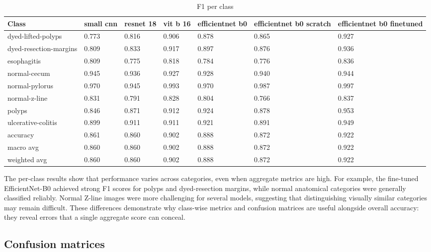 \documentclass[conference]{IEEEtran}
\begin{document}
\begin{table}[ht]
\caption{F1 per class}
\begin{center}
\begin{tabular}{|m{4em}|m{2em}|m{2em}|m{1.8em}|m{4em}|m{4em}|m{4em}|}
\hline
\textbf{Class}&small cnn & resnet 18 & vit b 16 & efficientnet b0 & efficientnet b0 scratch & efficientnet b0 finetuned\\
\hline
dyed-lifted-polyps & 0.773 & 0.816 & 0.906 & 0.878 & 0.865 & 0.927 \\
dyed-resection-margins & 0.809 & 0.833 & 0.917 & 0.897 & 0.876 & 0.936 \\
esophagitis & 0.809 & 0.775 & 0.818 & 0.784 & 0.776 & 0.836 \\
normal-cecum & 0.945 & 0.936 & 0.927 & 0.928 & 0.940 & 0.944 \\
normal-pylorus & 0.970 & 0.945 & 0.993 & 0.970 & 0.987 & 0.997 \\
normal-z-line & 0.831 & 0.791 & 0.828 & 0.804 & 0.766 & 0.837 \\
polyps & 0.846 & 0.871 & 0.912 & 0.924 & 0.878 & 0.953 \\
ulcerative-colitis & 0.899 & 0.911 & 0.911 & 0.921 & 0.891 & 0.949 \\
accuracy & 0.861 & 0.860 & 0.902 & 0.888 & 0.872 & 0.922 \\
macro avg & 0.860 & 0.860 & 0.902 & 0.888 & 0.872 & 0.922 \\
weighted avg & 0.860 & 0.860 & 0.902 & 0.888 & 0.872 & 0.922 \\
\hline
\end{tabular}
\label{tables:tab7}
\end{center}
\end{table}

The per-class results show that performance varies across categories, even when aggregate metrics are high. For example, the fine-tuned EfficientNet-B0 achieved strong F1 scores for polyps and dyed-resection margins, while normal anatomical categories were generally classified reliably. Normal Z-line images were more challenging for several models, suggesting that distinguishing visually similar categories may remain difficult. These differences demonstrate why class-wise metrics and confusion matrices are useful alongside overall accuracy: they reveal errors that a single aggregate score can conceal.

\subsection{Confusion matrices}
\end{document}
